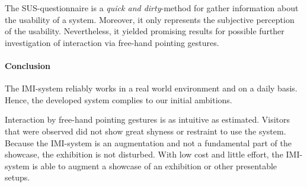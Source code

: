 The \ac{SUS}-questionnaire is a \textit{quick and dirty}-method for gather information about the usability of a system. Moreover, it only represents the subjective perception of the usability. Nevertheless, it yielded promising results for possible further investigation of interaction via free-hand pointing gestures. 


\paragraph{Conclusion}

The \ac{IMI}-system reliably works in a real world environment and on a daily basis. Hence, the developed system complies to our initial ambitions.

Interaction by free-hand pointing gestures is as intuitive as estimated. Visitors that were observed did not show great shyness or restraint to use the system. Because the \ac{IMI}-system is an augmentation and not a fundamental part of the showcase, the exhibition is not disturbed. With low cost and little effort, the \ac{IMI}-system is able to augment a showcase of an exhibition or other presentable setups.



%
